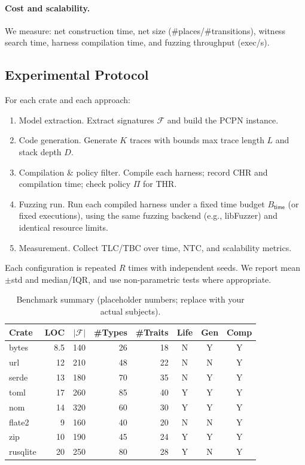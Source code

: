\documentclass[sigconf]{acmart}
\begin{document}
\paragraph{Cost and scalability.}
We measure:
net construction time, net size (\#places/\#transitions), witness search time,
harness compilation time, and fuzzing throughput (exec/s).

\subsection{Experimental Protocol}
\label{sec:evaluation:protocol}
For each crate and each approach:

\begin{enumerate}
\item Model extraction. Extract signatures $\mathcal{F}$ and build the PCPN instance.
\item Code generation. Generate $K$ traces with bounds max trace length $L$ and stack depth $D$.
\item Compilation \& policy filter. Compile each harness; record CHR and compilation time; check policy $\Pi$ for THR.
\item Fuzzing run. Run each compiled harness under a fixed time budget $B_{\mathsf{time}}$ (or fixed executions),
using the same fuzzing backend (e.g., libFuzzer) and identical resource limits.
\item Measurement. Collect TLC/TBC over time, NTC, and scalability metrics.
\end{enumerate}

Each configuration is repeated $R$ times with independent seeds.
We report mean$\pm$std and median/IQR, and use non-parametric tests where appropriate.


\begin{table}[t]
\centering
\caption{Benchmark summary (placeholder numbers; replace with your actual subjects).}
\label{tab:benchmarks}
\begin{tabular}{lrrrrccc}
\hline
Crate & LOC & $|\mathcal{F}|$ & \#Types & \#Traits & Life & Gen & Comp \\
\hline
bytes      &  8.5 & 140 & 26 & 18 & N & Y & Y \\
url        & 12 & 210 & 48 & 22 & N & N & Y \\
serde & 13 & 180 & 70 & 35 & N & Y & Y \\
toml & 17 & 260 & 85 & 40 & Y & Y & Y \\
nom        & 14 & 320 & 60 & 30 & Y & Y & Y \\
flate2     &  9 & 160 & 40 & 20 & N & N & Y \\
zip        & 10 & 190 & 45 & 24 & Y & Y & Y \\
rusqlite   & 20 & 250 & 80 & 28 & Y & N & Y \\
\hline
\end{tabular}
\end{table}
\end{document}
